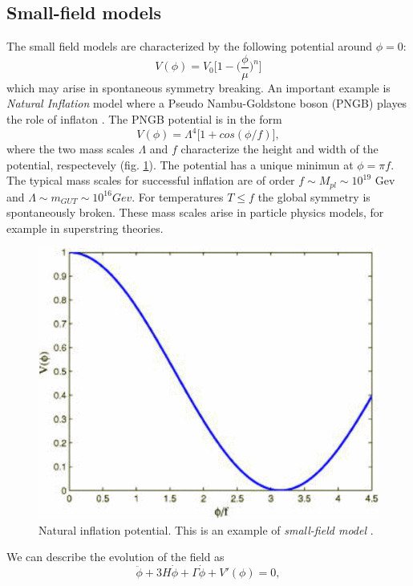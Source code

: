 \documentclass[11pt,a4paper,twoside]{book}
\begin{document}
 \subsection{Small-field models}
 The small field models are characterized by the following potential around $\phi=0$:
 \begin{equation}
 	\label{Chap2:small-field1}
 	V(\phi) = V_{0}\Big [1-\Big (\frac{\phi}{\mu}\Big)^{n} \Big]
 \end{equation}
which may arise in spontaneous symmetry breaking.
An important example is \textit{Natural Inflation} model where a Pseudo Nambu-Goldstone boson (PNGB) playes the role of inflaton \cite{Chap2:NaturalInflation}. The PNGB potential is in  the form
\begin{equation}
	\label{Chap2:PNGBPotential}
	V(\phi) = \Lambda^{4}\big [1 + cos(\phi/f) \big],
\end{equation}  
 where the two mass scales $\Lambda$ and $ f $ characterize the height and width of the potential, respectevely (fig. \ref{fig:naturalinflationinflationdynamics-and-reheating}). The potential has a unique minimun at $ \phi = \pi f $. The typical mass scales for successful inflation are of order  $ f \sim M_{pl} \sim 10^{19} $ Gev and $ \Lambda \sim m_{GUT} \sim 10^{16} Gev $. For temperatures $ T \le f $ the global symmetry is spontaneously broken. These mass scales arise in particle physics models, for example in superstring theories. \\
 \begin{figure}
 	\centering
 	\includegraphics[width=0.5\linewidth, height=0.25\textheight]{"Images/Chap2/NaturalInflation_InflationDynamics and reheating"}
 	\caption{Natural inflation potential. This is an example of \textit{small-field model} \cite{InflationDynamicsAndReheating:chap1}.}
 	\label{fig:naturalinflationinflationdynamics-and-reheating}
 \end{figure}
 
 We can describe the evolution of the field as 
 \begin{equation}
 	\label{Chap2:eomSmallFieldModel}
 	\ddot{\phi} + 3H\dot{\phi} + \Gamma\dot{\phi} + V'(\phi) = 0,
 \end{equation}
 
\end{document}
